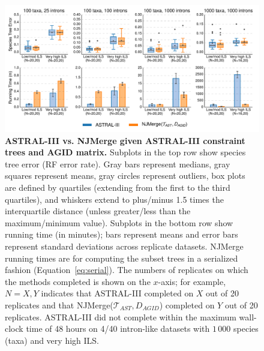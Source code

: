 \begin{figure}[!h]
\centering
\includegraphics[width=\textwidth]{figures/njmerge-fig8.pdf}
\caption{
{\bf ASTRAL-III vs. NJMerge given ASTRAL-III constraint trees and AGID matrix. }
Subplots in the top row show species tree error (RF error rate).
Gray bars represent medians, gray squares represent means, gray circles represent outliers, box plots are defined by quartiles (extending from the first to the third quartiles), and whiskers extend to plus/minus 1.5 times the interquartile distance (unless greater/less than the maximum/minimum value).
Subplots in the bottom row show running time (in minutes); bars represent means and error bars represent standard deviations across replicate datasets.
NJMerge running times are for computing the subset trees in a  serialized fashion (Equation~\ref{eq:serial}).
The numbers of replicates on which the methods completed is shown on the $x$-axis; for example, $N=X,Y$ indicates that ASTRAL-III completed on $X$ out of 20 replicates and that NJMerge($\mathcal{T}_{AST},D_{AGID}$) completed on $Y$ out of 20 replicates.
ASTRAL-III did not complete within the maximum wall-clock time of 48 hours on 4/40 intron-like datasets with $1\,000$ species (taxa) and very high ILS.
}
\label{fig:astral-intron}
\end{figure}

